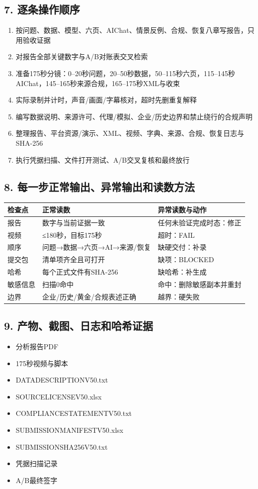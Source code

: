 \documentclass[UTF8,openany,zihao=-4]{ctexbook}
\renewcommand{\_}{\textunderscore\allowbreak}
\begin{document}
\subsection*{7. 逐条操作顺序}
\begin{enumerate}
\item 按问题、数据、模型、六页、AIChat、情景反例、合规、恢复八章写报告，只用验收证据
\item 对报告全部关键数字与A/B对账表交叉检索
\item 准备175秒分镜：0--20秒问题，20--50秒数据，50--115秒六页，115--145秒AIChat，145--165秒来源合规，165--175秒XML与收束
\item 实际录制并计时，声音/画面/字幕核对，超时先删重复解释
\item 编写数据说明、来源许可、代理/模拟、企业/历史边界和禁止绕行的合规声明
\item 整理报告、平台资源/演示、XML、视频、字典、来源、合规、恢复日志与SHA-256
\item 执行凭据扫描、文件打开测试、A/B交叉复核和最终放行
\end{enumerate}

\subsection*{8. 每一步正常输出、异常输出和读数方法}
\noindent\begin{tabularx}{\textwidth}{@{}p{}XX@{}}
\toprule
\textbf{检查点} & \textbf{正常读数} & \textbf{异常读数与动作} \\
\midrule
报告 & 数字与当前证据一致 & 任何未验证完成时态：修正 \\
视频 & ≤180秒，目标175秒 & 超时：FAIL \\
顺序 & 问题→数据→六页→AI→来源/恢复 & 缺硬交付：补录 \\
提交包 & 清单项齐全且可打开 & 缺项：BLOCKED \\
哈希 & 每个正式文件有SHA-256 & 缺哈希：补生成 \\
敏感信息 & 扫描0命中 & 命中：删除敏感副本并重封 \\
边界 & 企业/历史/黄金/合规表述正确 & 越界：硬失败 \\
\bottomrule
\end{tabularx}

\subsection*{9. 产物、截图、日志和哈希证据}
\begin{itemize}[label=$\square$]
\item 分析报告PDF
\item 175秒视频与脚本
\item DATA\_DESCRIPTION\_V50.txt
\item SOURCE\_LICENSE\_V50.xlsx
\item COMPLIANCE\_STATEMENT\_V50.txt
\item SUBMISSION\_MANIFEST\_V50.xlsx
\item SUBMISSION\_SHA256\_V50.txt
\item 凭据扫描记录
\item A/B最终签字
\end{itemize}
\end{document}
